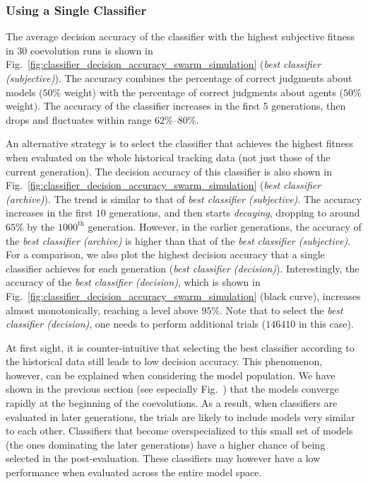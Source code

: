 \subsubsection{Using a Single Classifier}

The average decision accuracy of the classifier with the highest subjective fitness in $30$ coevolution runs is shown in Fig.~\ref{fig:classifier_decision_accuracy_swarm_simulation} (\textit{best classifier (subjective)}). The accuracy combines the percentage of correct judgments about models ($50\%$ weight) with the percentage of correct judgments about agents ($50\%$ weight). The accuracy of the classifier increases in the first $5$ generations, then drops and fluctuates within range $62\%$--$80\%$.

An alternative strategy is to select the classifier that achieves the highest fitness when evaluated on the whole historical tracking data (not just those of the current generation). The decision accuracy of this classifier is also shown in Fig.~\ref{fig:classifier_decision_accuracy_swarm_simulation} (\textit{best classifier (archive)}). The trend is similar to that of \textit{best classifier (subjective)}. The accuracy increases in the first $10$ generations,  and then starts \emph{decaying}, dropping to around $65\%$ by the $1000^\textrm{th}$ generation. However, in the earlier generations, the accuracy of the \textit{best classifier (archive)} is higher than that of the \textit{best classifier (subjective)}. For a comparison, we also plot the highest decision accuracy that a single classifier achieves for each generation (\textit{best classifier (decision)}). Interestingly, the accuracy of the \textit{best classifier (decision)}, which is shown in  Fig.~\ref{fig:classifier_decision_accuracy_swarm_simulation} (black curve), increases almost monotonically, reaching a level above $95\%$. Note that to select the \textit{best classifier (decision)}, one needs to perform additional trials ($146410$ in this case).

At first sight, it is counter-intuitive that selecting the best classifier according to the historical data still leads to low decision accuracy. This phenomenon, however, can be explained when considering the model population. We have shown in the previous section (see especially Fig.~) that the models converge rapidly at the beginning of the coevolutions. As a result, when classifiers are evaluated in later generations, the trials are likely to include models very similar to each other. Classifiers that become overspecialized to this small set of models (the ones dominating the later generations) have a higher chance of being selected in the post-evaluation. These classifiers may however have a low performance when evaluated across the entire model space.

